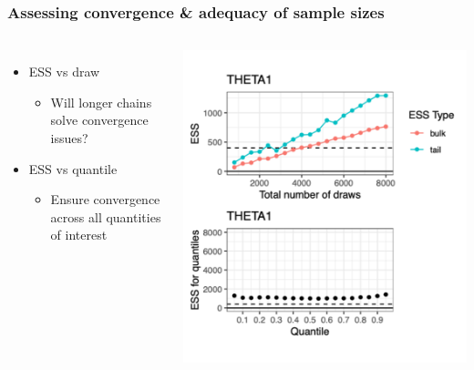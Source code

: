 \documentclass[handout]{beamer}
\begin{document}
\begin{frame}
  \frametitle{Assessing convergence \& adequacy of sample sizes}

\begin{columns}
  \begin{itemize}
    \item ESS vs draw
          \begin{itemize}
            \item Will longer chains solve convergence issues?
          \end{itemize}
    \item ESS vs quantile
          \begin{itemize}
            \item Ensure convergence across all quantities of interest
          \end{itemize}
  \end{itemize}
  \center
  \vspace{-16pt}
  \includegraphics[width=\textwidth]{graphics/ess-vs-draw-quantile.pdf}
\end{columns}

\end{frame}
\end{document}
